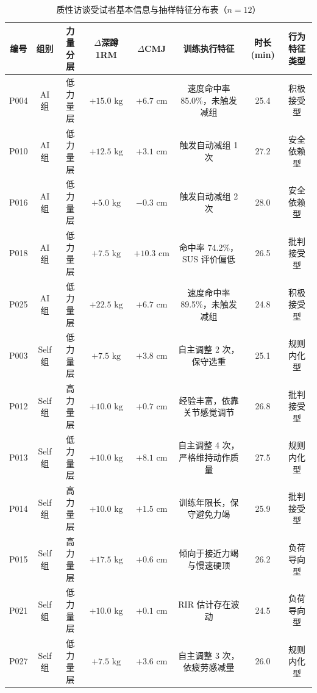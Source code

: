 \documentclass[UTF8,zihao=-4,twoside,openany]{ctexbook}
\begin{document}
\begin{table}[htbp]
  \centering
  \caption{质性访谈受试者基本信息与抽样特征分布表（$n=12$）}
  \label{tab:ch4-interview-cases}
  \vspace{6pt}
  \fontsize{8.5pt}{11pt}\selectfont
  \setlength{\tabcolsep}{3.5pt}
  \begin{tabularx}{\textwidth}{cccccccc}
    \toprule
    \textbf{编号} & \textbf{组别} & \textbf{力量分层} & \textbf{$\Delta$深蹲 1RM} & \textbf{$\Delta$CMJ} & \textbf{训练执行特征} & \textbf{时长(min)} & \textbf{行为特征类型} \\
    \midrule
    P004 & AI 组 & 低力量层 & $+15.0\text{ kg}$ & $+6.7\text{ cm}$ & 速度命中率 85.0\%，未触发减组 & 25.4 & 积极接受型 \\
    P010 & AI 组 & 低力量层 & $+12.5\text{ kg}$ & $+3.1\text{ cm}$ & 触发自动减组 1 次 & 27.2 & 安全依赖型 \\
    P016 & AI 组 & 低力量层 & $+5.0\text{ kg}$ & $-0.3\text{ cm}$ & 触发自动减组 2 次 & 28.0 & 安全依赖型 \\
    P018 & AI 组 & 低力量层 & $+7.5\text{ kg}$ & $+10.3\text{ cm}$ & 命中率 74.2\%，SUS 评价偏低 & 26.5 & 批判接受型 \\
    P025 & AI 组 & 低力量层 & $+22.5\text{ kg}$ & $+6.7\text{ cm}$ & 速度命中率 89.5\%，未触发减组 & 24.8 & 积极接受型 \\
    P003 & Self 组 & 低力量层 & $+7.5\text{ kg}$ & $+3.8\text{ cm}$ & 自主调整 2 次，保守选重 & 25.1 & 规则内化型 \\
    P012 & Self 组 & 高力量层 & $+10.0\text{ kg}$ & $+0.7\text{ cm}$ & 经验丰富，依靠关节感觉调节 & 26.8 & 批判接受型 \\
    P013 & Self 组 & 低力量层 & $+10.0\text{ kg}$ & $+8.1\text{ cm}$ & 自主调整 4 次，严格维持动作质量 & 27.5 & 规则内化型 \\
    P014 & Self 组 & 高力量层 & $+10.0\text{ kg}$ & $+1.5\text{ cm}$ & 训练年限长，保守避免力竭 & 25.9 & 批判接受型 \\
    P015 & Self 组 & 高力量层 & $+17.5\text{ kg}$ & $+0.6\text{ cm}$ & 倾向于接近力竭与慢速硬顶 & 26.2 & 负荷导向型 \\
    P021 & Self 组 & 低力量层 & $+10.0\text{ kg}$ & $+0.1\text{ cm}$ & RIR 估计存在波动 & 24.5 & 负荷导向型 \\
    P027 & Self 组 & 低力量层 & $+7.5\text{ kg}$ & $+3.6\text{ cm}$ & 自主调整 3 次，依疲劳感减量 & 26.0 & 规则内化型 \\
    \bottomrule
  \end{tabularx}
\end{table}
\end{document}
